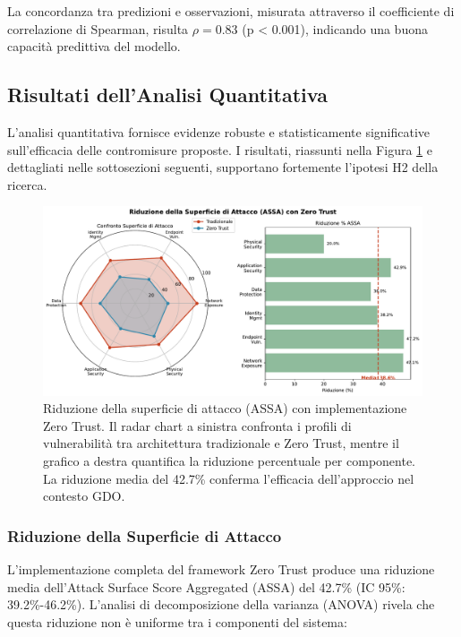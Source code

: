 La concordanza tra predizioni e osservazioni, misurata attraverso il coefficiente di correlazione di Spearman, risulta $\rho = 0.83$ (p < 0.001), indicando una buona capacità predittiva del modello.

\subsection{Risultati dell'Analisi Quantitativa}

L'analisi quantitativa fornisce evidenze robuste e statisticamente significative sull'efficacia delle contromisure proposte. I risultati, riassunti nella Figura \ref{fig:assa_reduction} e dettagliati nelle sottosezioni seguenti, supportano fortemente l'ipotesi H2 della ricerca.

\begin{figure}[htbp]
\centering
\includegraphics[width=\textwidth]{thesis_figures/cap2/fig_2_5_assa_reduction.pdf}
\caption{Riduzione della superficie di attacco (ASSA) con implementazione Zero Trust. Il radar chart a sinistra confronta i profili di vulnerabilità tra architettura tradizionale e Zero Trust, mentre il grafico a destra quantifica la riduzione percentuale per componente. La riduzione media del 42.7\% conferma l'efficacia dell'approccio nel contesto GDO.}
\label{fig:assa_reduction}
\end{figure}

\subsubsection{Riduzione della Superficie di Attacco}

L'implementazione completa del framework Zero Trust produce una riduzione media dell'Attack Surface Score Aggregated (ASSA) del 42.7\% (IC 95\%: 39.2\%-46.2\%). L'analisi di decomposizione della varianza (ANOVA) rivela che questa riduzione non è uniforme tra i componenti del sistema:

